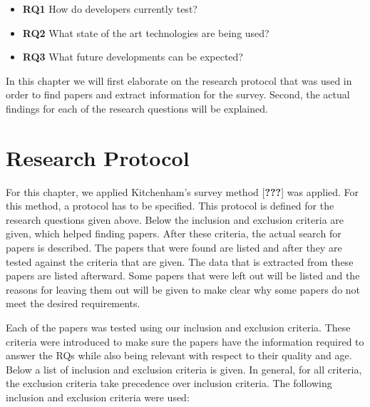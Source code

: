 \documentclass[]{book}
\providecommand{\tightlist}{%
  \setlength{\itemsep}{0pt}\setlength{\parskip}{0pt}}
\begin{document}
\begin{itemize}
\tightlist
\item
  \textbf{RQ1} How do developers currently test?
\item
  \textbf{RQ2} What state of the art technologies are being used?
\item
  \textbf{RQ3} What future developments can be expected?
\end{itemize}

In this chapter we will first elaborate on the research protocol that
was used in order to find papers and extract information for the survey.
Second, the actual findings for each of the research questions will be
explained.

\section{Research Protocol}\label{research-protocol}

For this chapter, we applied Kitchenham's survey method
{[}{\textbf{???}}{]} was applied. For this method, a protocol has to be
specified. This protocol is defined for the research questions given
above. Below the inclusion and exclusion criteria are given, which
helped finding papers. After these criteria, the actual search for
papers is described. The papers that were found are listed and after
they are tested against the criteria that are given. The data that is
extracted from these papers are listed afterward. Some papers that were
left out will be listed and the reasons for leaving them out will be
given to make clear why some papers do not meet the desired
requirements.

Each of the papers was tested using our inclusion and exclusion
criteria. These criteria were introduced to make sure the papers have
the information required to answer the RQs while also being relevant
with respect to their quality and age. Below a list of inclusion and
exclusion criteria is given. In general, for all criteria, the exclusion
criteria take precedence over inclusion criteria. The following
inclusion and exclusion criteria were used:
\end{document}
